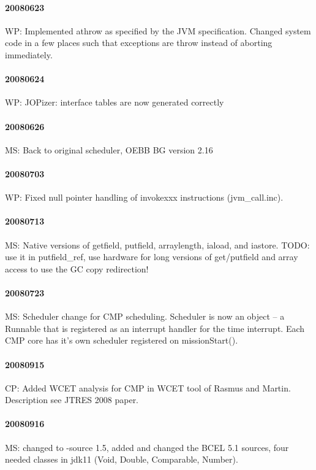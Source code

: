 \documentclass[a4paper,12pt]{scrartcl}
\newcommand{\code}[1]{{\textsf{#1}}}
\begin{document}
\paragraph{20080623} WP: Implemented athrow as specified by the JVM specification. Changed
system code in a few places such that exceptions are throw instead of
aborting immediately.

\paragraph{20080624} WP: JOPizer: interface tables are now generated correctly

\paragraph{20080626} MS: Back to original scheduler, OEBB BG version
2.16

\paragraph{20080703} WP: Fixed null pointer handling of invokexxx
instructions (\code{jvm\_call.inc}).

\paragraph{20080713} MS: Native versions of getfield, putfield,
arraylength, iaload, and iastore. TODO: use it in putfield\_ref, use
hardware for long versions of get/putfield and array access to use
the GC copy redirection!

\paragraph{20080723} MS: Scheduler change for CMP scheduling.
Scheduler is now an object -- a \code{Runnable} that is registered as
an interrupt handler for the time interrupt. Each CMP core has it's
own scheduler registered on \code{missionStart()}.

\paragraph{20080915} CP: Added WCET analysis for CMP in WCET tool of
Rasmus and Martin. Description see JTRES 2008 paper.

\paragraph{20080916} MS: changed to -source 1.5, added and changed
the BCEL 5.1 sources, four needed classes in jdk11 (Void, Double,
Comparable, Number).
\end{document}
